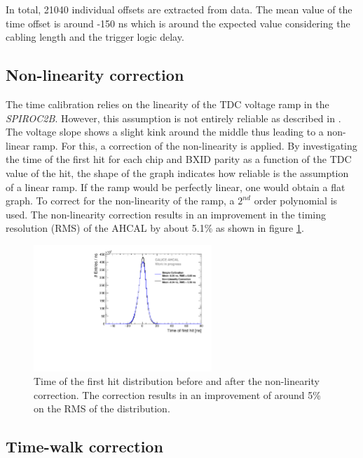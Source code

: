 \documentclass{JINST}
\begin{document}
In total, 21040 individual offsets are extracted from data. The mean value of the time offset is around -150 ns which is around the expected value considering the cabling length and the trigger logic delay.

\subsection{Non-linearity correction}

The time calibration relies on the linearity of the TDC voltage ramp in the \textit{SPIROC2B}. However, this assumption is not entirely reliable as described in \cite{Hartbrich2011, Brianne2012}. The voltage slope shows a slight kink around the middle thus leading to a non-linear ramp. For this, a correction of the non-linearity is applied. By investigating the time of the first hit for each chip and BXID parity as a function of the TDC value of the hit, the shape of the graph indicates how reliable is the assumption of a linear ramp. If the ramp would be perfectly linear, one would obtain a flat graph. To correct for the non-linearity of the ramp, a $2^{nd}$ order polynomial is used. The non-linearity correction results in an improvement in the timing resolution (RMS) of the AHCAL by about 5.1\% as shown in figure \ref{fig:NLCorr}.

\begin{figure}[htbp!]
	\centering
	\includegraphics[width=0.6\textwidth]{fig/Timing_AHCAL_LinCorrection.pdf}
	\caption{Time of the first hit distribution before and after the non-linearity correction. The correction results in an improvement of around 5\% on the RMS of the distribution.}\label{fig:NLCorr}
\end{figure}

\subsection{Time-walk correction}
\end{document}
